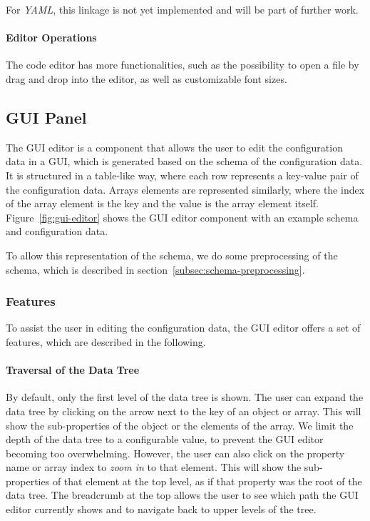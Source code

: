 For \textit{YAML}, this linkage is not yet implemented and will be part of further work.

\paragraph{Editor Operations}
The code editor has more functionalities, such as the possibility to open a file by drag and drop into the editor, as well as customizable font sizes.

\subsection{GUI Panel}\label{subsec:gui-editor}

The GUI editor is a component that allows the user to edit the configuration data in a GUI, which is generated based on the schema of the configuration data.
It is structured in a table-like way, where each row represents a key-value pair of the configuration data.
Arrays elements are represented similarly, where the index of the array element is the key and the value is the array element itself.
Figure~\ref{fig:gui-editor} shows the GUI editor component with an example schema and configuration data.


To allow this representation of the schema, we do some preprocessing of the schema, which is described in section~\ref{subsec:schema-preprocessing}.

\subsubsection{Features}\label{subsubsec:gui-editor-features}

To assist the user in editing the configuration data, the GUI editor offers a set of features, which are described in the following.

\paragraph{Traversal of the Data Tree}
By default, only the first level of the data tree is shown.
The user can expand the data tree by clicking on the arrow next to the key of an object or array.
This will show the sub-properties of the object or the elements of the array.
We limit the depth of the data tree to a configurable value, to prevent the GUI editor becoming too overwhelming.
However, the user can also click on the property name or array index to \textit{zoom in} to that element.
This will show the sub-properties of that element at the top level, as if that property was the root of the data tree.
The breadcrumb at the top allows the user to see which path the GUI editor currently shows and to navigate back to upper levels of the tree.


